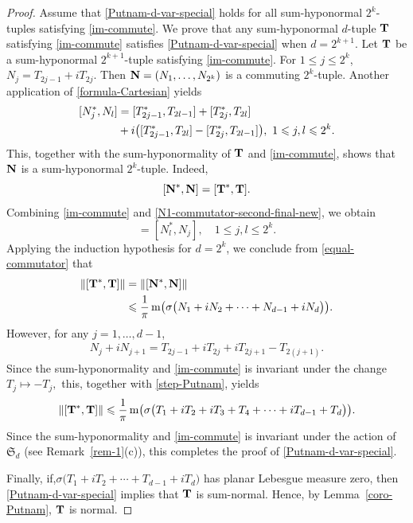 \documentclass[10pt, a4paper, oneside, reqno]{amsproc}
\numberwithin{equation}{section}
\theoremstyle{remark}
\theoremstyle{definition}
\newcommand*{\Le}{\leqslant}
\begin{document}
\begin{proof}
Assume that \eqref{Putnam-d-var-special} holds for all sum-hyponormal $2^k$-tuples satisfying \eqref{im-commute}. 
We prove that any sum-hyponormal $d$-tuple ${\bf T}$ satisfying \eqref{im-commute} satisfies \eqref{Putnam-d-var-special} when $d=2^{k+1}$.
Let ${\bf T}$ be a sum-hyponormal $2^{k+1}$-tuple satisfying \eqref{im-commute}.
For $1 \Le j \Le 2^k$, $N_j=T_{2j-1}+iT_{2j}$.
Then
${\bf N}=(N_1, \ldots, N_{2^{k}})$ is a commuting $2^k$-tuple. 
Another application of \eqref{formula-Cartesian} yields
\begin{align} 
\notag
[N_j^*,N_l]
&=[T_{2j-1}^*,T_{2l-1}]
+[T_{2j}^*,T_{2l}] \\ \label{N1-commutator-second-final-new}
&+i\big([T_{2j-1}^*,T_{2l}]
-[T_{2j}^*,T_{2l-1}]\big), ~ 1 \Le j, l \Le 2^{k}.
\end{align}
This, together with the sum-hyponormality of ${\bf T}$ and \eqref{im-commute}, shows that ${\bf N}$ is a sum-hyponormal $2^{k}$-tuple. Indeed,
\begin{equation}
\label{equal-commutator}
[{\bf N}^*, {\bf N}] = [{\bf T}^*, {\bf T}].
\end{equation} 
Combining \eqref{im-commute} and \eqref{N1-commutator-second-final-new}, we obtain
\begin{equation*} 
[N^*_j, N_l]=[N^*_l, N_j], \quad 1 \Le j, l \Le 2^{k}. 
\end{equation*}
Applying the induction hypothesis for $d=2^{k}$, we conclude from \eqref{equal-commutator} that 
\begin{align} \label{step-Putnam}
 \|[{\bf T}^*, {\bf T}]\| 
&= \|[{\bf N}^*, {\bf N}]\| \\ \notag
& \Le \frac{1}{\pi}\,  \mathrm{m}\big(\sigma\big(N_{1}+iN_{2}+ \cdots + N_{d-1}+iN_{d}\big)\big). 
\end{align}
However, for any $j=1, \ldots, d-1$,
\begin{align*}
N_{j}+iN_{j+1} 
= T_{2j-1}+iT_{2j}+ iT_{2j+1}-T_{2(j+1)}.
\end{align*}
Since the sum-hyponormality and \eqref{im-commute} is invariant under the change $T_j \mapsto -T_j,$ 
this, together with \eqref{step-Putnam}, yields
\begin{align*}
 \|[{\bf T}^*, {\bf T}]\| 
 \Le \frac{1}{\pi}\,  \mathrm{m}\big(\sigma\big(T_{1}+iT_{2}+ iT_3 + T_4 + \cdots + iT_{d-1}+T_{d}\big)\big). 
\end{align*}
Since the sum-hyponormality and \eqref{im-commute} is invariant under the action of $\mathfrak S_d$ (see Remark~\ref{rem-1}(c)), this completes the proof of \eqref{Putnam-d-var-special}.

Finally, if,$\sigma\big(T_{1}+iT_{2}+ \cdots + T_{d-1}+iT_{d}\big)$ has planar Lebesgue measure zero, then \eqref{Putnam-d-var-special} implies that ${\bf T}$ is sum-normal. Hence, by Lemma~\ref{coro-Putnam}, ${\bf T}$ is normal.
\end{proof}
\end{document}
